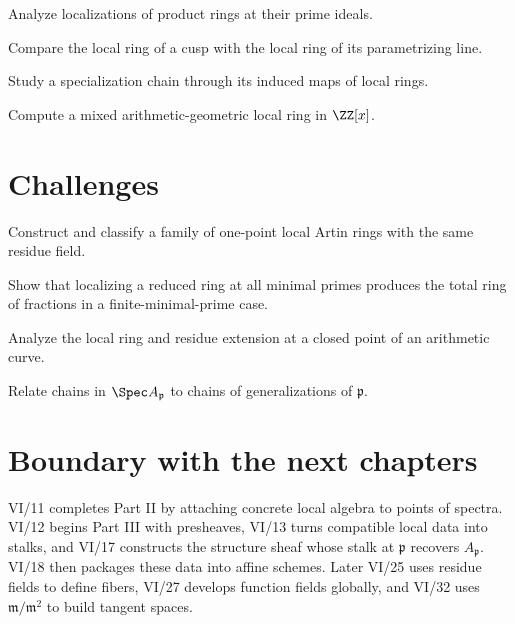 \begin{problem}Analyze localizations of product rings at their prime ideals.\end{problem}
\begin{problem}Compare the local ring of a cusp with the local ring of its parametrizing line.\end{problem}
\begin{problem}Study a specialization chain through its induced maps of local rings.\end{problem}
\begin{problem}Compute a mixed arithmetic-geometric local ring in $\ZZ[x]$.\end{problem}
\fi

\section{Challenges}
\ifdefined\FullProblemDossiers

\else
\begin{problem}Construct and classify a family of one-point local Artin rings with the same residue field.\end{problem}
\begin{problem}Show that localizing a reduced ring at all minimal primes produces the total ring of fractions in a finite-minimal-prime case.\end{problem}
\begin{problem}Analyze the local ring and residue extension at a closed point of an arithmetic curve.\end{problem}
\begin{problem}Relate chains in $\Spec A_{\mathfrak p}$ to chains of generalizations of $\mathfrak p$.\end{problem}
\fi

\section{Boundary with the next chapters}

VI/11 completes Part II by attaching concrete local algebra to points of spectra.  VI/12 begins
Part III with presheaves, VI/13 turns compatible local data into stalks, and VI/17 constructs
the structure sheaf whose stalk at $\mathfrak p$ recovers $A_{\mathfrak p}$.  VI/18 then
packages these data into affine schemes.  Later VI/25 uses residue fields to define fibers,
VI/27 develops function fields globally, and VI/32 uses
$\mathfrak m/\mathfrak m^2$ to build tangent spaces.
